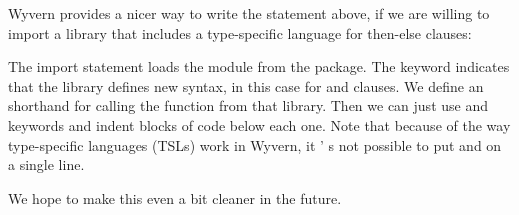 \documentclass{article}
\begin{document}
\begin{mdP}[class={indent},data-line={159}]%
{}Wyvern provides a nicer way to write the %
{}%
{} statement above, if we
are willing to import a library that includes a type-specific language
for then-else clauses:%
\end{mdP}%
\begin{mdPre}[class={para-block,pre-indented},data-line={163}]%
%
\end{mdPre}%
\begin{mdP}[data-line={173}]%
{}The import statement loads the %
{}%
{} module from the %
{}%
{} package.
The %
{}%
{} keyword indicates that the library defines new syntax,
in this case for %
{}%
{} and %
{}%
{} clauses.  We define an %
{}%
{} shorthand
for calling the %
{}%
{} function from that library.  Then we can just use
{}%
{} and %
{}%
{} keywords and indent blocks of code below each one.  Note
that because of the way type-specific languages (TSLs) work in Wyvern, it%
{}{'}%
{}s
not possible to put %
{}%
{} and %
{}%
{} on a single line.%
\end{mdP}%
\begin{mdP}[class={indent},data-line={181}]%
{}We hope to make this even a bit cleaner in the future.
{} %
{}%
\end{mdP}%
\end{document}
